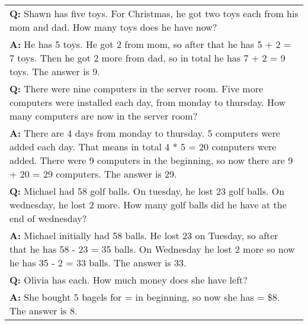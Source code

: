 \begin{table*}
\begin{tabular}{p{13.5cm}}
        \vspace{0mm}
        \textbf{Q:} Shawn has five toys. For Christmas, he got two toys each from his mom and dad. How many toys does he have now? \\
        \vspace{-1mm}
        \textbf{A:} He has 5 toys. He got 2 from mom, so after that he has 5 + 2 = 7 toys. Then he got 2 more from dad, so in total he has 7 + 2 = 9 toys. The answer is 9. \\
        \vspace{0mm}
        \textbf{Q:} There were nine computers in the server room. Five more computers were installed each day, from monday to thursday. How many computers are now in the server room? \\
        \vspace{-1mm}
        \textbf{A:} There are 4 days from monday to thursday. 5 computers were added each day. That means in total 4 * 5 = 20 computers were added. There were 9 computers in the beginning, so now there are 9 + 20 = 29 computers. The answer is 29. \\
        \vspace{0mm}
        \textbf{Q:} Michael had 58 golf balls. On tuesday, he lost 23 golf balls. On wednesday, he lost 2 more. How many golf balls did he have at the end of wednesday? \\
        \vspace{-1mm}
        \textbf{A:} Michael initially had 58 balls. He lost 23 on Tuesday, so after that he has 58 - 23 = 35 balls. On Wednesday he lost 2 more so now he has 35 - 2 = 33 balls. The answer is 33.\ \\
        \vspace{0mm}
        \textbf{Q:} Olivia has \3 each. How much money does she have left? \\
        \vspace{-1mm}
        \textbf{A:} She bought 5 bagels for \3 = \23 in beginning, so now she has \15 = \$8. The answer is 8. \\
        \bottomrule
    \end{tabular}
    \label{tab:prompt-math}
    \vspace{-0.1in}
\end{table*}

